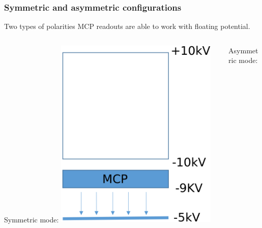 
\begin{frame}[t]
  \frametitle{Symmetric and asymmetric configurations}
  \begin{block}{Two types of polarities}
    MCP readouts are able to work with floating potential.
  \end{block}
  \begin{columns}[T]
    \centering
    \begin{column}{0.45\textwidth}
      \centering
      Symmetric mode:
      \includegraphics[width=0.7\textwidth]{06_Backup/fig/fig000_SYM}
    \end{column}
    \begin{column}{0.45\textwidth}
      \centering
      Asymmetric mode:

\end{column}
\end{columns}
\end{frame}
